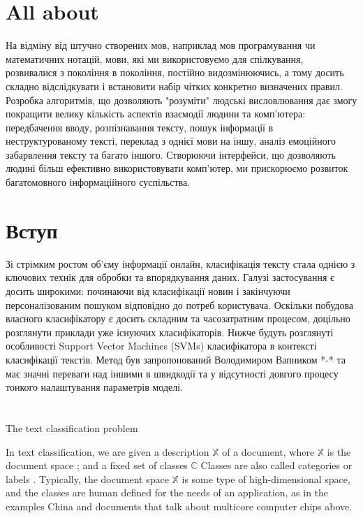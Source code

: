 \section{All about}
На відміну від штучно створених мов, наприклад мов програмування чи математичних нотацій,
мови, які ми використовуємо для спілкування, розвивалися з покоління в покоління, постійно
видозмінюючись, а тому досить складно відслідкувати і встановити набір чітких конкретно
визначених правил. Розробка алгоритмів, що дозволяють "розуміти" людські висловлювання
дає змогу покращити велику кількість аспектів взаємодії людини та комп'ютера: передбачення
вводу, розпізнавання тексту, пошук інформації в неструктурованому тексті, переклад з однієї
мови на іншу, аналіз емоційного забарвлення тексту та багато іншого. Створюючи інтерфейси,
що дозволяють людині більш ефективно використовувати комп'ютер, ми прискорюємо
розвиток багатомовного інформаційного суспільства.

\section{Вступ}
Зі стрімким ростом об'єму інформації онлайн, класифікація тексту стала однією з ключових
технік для обробки та впорядкування даних. Галузі застосування є досить широкими:
починаючи від класифікації новин і закінчуючи персоналізованим пошуком відповідно до
потреб користувача. Оскільки побудова власного класифікатору є досить складним та
часозатратним процесом, доцільно розглянути приклади уже існуючих класифікаторів.
Нижче будуть розглянуті особливості  Support Vector Machines (SVMs) класифікатора в
контексті класифікації текстів. Метод був запропонований Володимиром Вапником *-* та
має значні переваги над іншими в швидкодії та у відсутності довгого процесу тонкого
налаштування параметрів моделі.

\section{}
The text classification problem \cite{DUMMY:1}

In text classification, we are given a description
$\mathbb{X}$ of a document, where $\mathbb{X}$ is the document space ; and a fixed set
of classes  $\mathbb{C}$ Classes are also called categories or
labels . Typically, the document space  $\mathbb{X}$ is some type of high-dimensional space,
and the classes are human defined for the needs of an application, as in the examples China
and documents that talk about multicore computer chips above.

